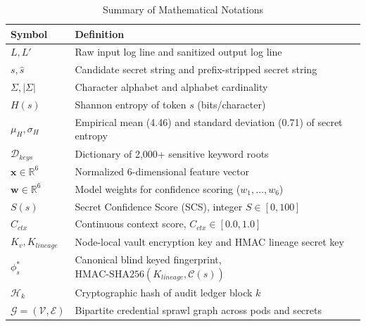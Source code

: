 \documentclass[conference]{IEEEtran}
\begin{document}
\begin{table}[t]
\caption{Summary of Mathematical Notations}
\label{tab:notations}
\centering
\footnotesize
\setlength{\tabcolsep}{4pt}
\begin{tabularx}{\linewidth}{lX}
\toprule
\textbf{Symbol} & \textbf{Definition} \\
\midrule
$L, L'$ & Raw input log line and sanitized output log line \\
$s, \hat{s}$ & Candidate secret string and prefix-stripped secret string \\
$\Sigma, |\Sigma|$ & Character alphabet and alphabet cardinality \\
$H(s)$ & Shannon entropy of token $s$ (bits/character) \\
$\mu_H, \sigma_H$ & Empirical mean (4.46) and standard deviation (0.71) of secret entropy \\
$\mathcal{D}_{keys}$ & Dictionary of 2,000+ sensitive keyword roots \\
$\mathbf{x} \in \mathbb{R}^6$ & Normalized 6-dimensional feature vector \\
$\mathbf{w} \in \mathbb{R}^6$ & Model weights for confidence scoring ($w_1,\dots,w_6$) \\
$S(s)$ & Secret Confidence Score (SCS), integer $S \in [0, 100]$ \\
$C_{ctx}$ & Continuous context score, $C_{ctx} \in [0.0, 1.0]$ \\
$K_v, K_{lineage}$ & Node-local vault encryption key and HMAC lineage secret key \\
$\phi_s^*$ & Canonical blind keyed fingerprint, $\text{HMAC-SHA256}(K_{lineage}, \mathcal{C}(s))$ \\
$\mathcal{H}_k$ & Cryptographic hash of audit ledger block $k$ \\
$\mathcal{G} = (\mathcal{V}, \mathcal{E})$ & Bipartite credential sprawl graph across pods and secrets \\
\bottomrule
\end{tabularx}
\end{table}
\end{document}
